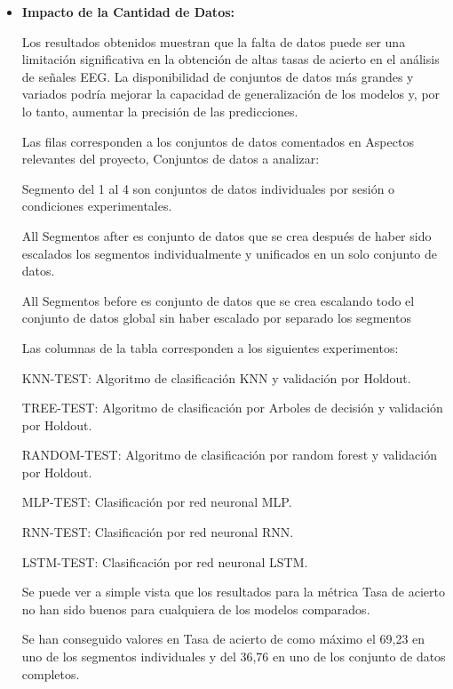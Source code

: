 \begin{itemize}
	
	\item
	\textbf{Impacto de la Cantidad de Datos:}
	
	Los resultados obtenidos muestran que la falta de datos puede ser una limitación significativa en la obtención de altas tasas de acierto en el análisis de señales EEG. La disponibilidad de conjuntos de datos más grandes y variados podría mejorar la capacidad de generalización de los modelos y, por lo tanto, aumentar la precisión de las predicciones.
	

	Las filas corresponden a los conjuntos de datos comentados en Aspectos relevantes del proyecto, Conjuntos de datos a analizar:
	
	Segmento del 1 al 4 son conjuntos de datos individuales por sesión o condiciones experimentales.
	
	All Segmentos after es conjunto de datos que se crea después de haber sido escalados los segmentos individualmente y unificados en un solo conjunto de datos.

	All Segmentos before es conjunto de datos que se crea escalando todo el conjunto de datos global sin haber escalado por separado los segmentos
	
	Las columnas de la tabla corresponden a los siguientes experimentos:
	
	KNN-TEST: Algoritmo de clasificación KNN y validación por Holdout.
	
	TREE-TEST: Algoritmo de clasificación por Arboles de decisión y validación por Holdout.

	RANDOM-TEST: Algoritmo de clasificación por random forest y validación por Holdout.

	MLP-TEST: Clasificación por red neuronal MLP.

	RNN-TEST: Clasificación por red neuronal RNN.

	LSTM-TEST: Clasificación por red neuronal LSTM.

	Se puede ver a simple vista que los resultados para la métrica Tasa de acierto no han sido buenos para cualquiera de los modelos comparados.

	Se han conseguido valores en Tasa de acierto de como máximo el 69,23 en uno de los segmentos individuales y del 36,76 en uno de los conjunto de datos completos.



\end{itemize}
